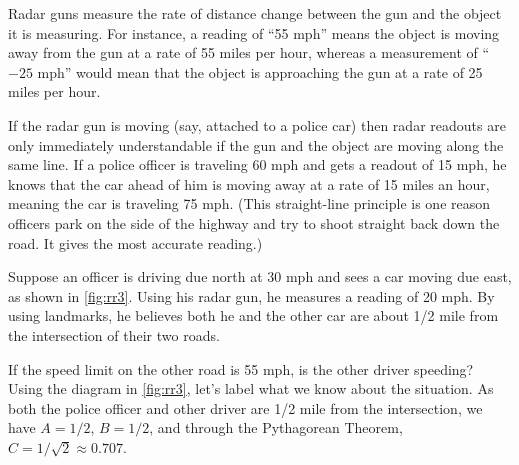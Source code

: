 \begin{example}\label{ex_rr3}
Radar guns measure the rate of distance change between the gun and the object it is measuring. For instance, a reading of ``55 mph'' means the object is moving away from the gun at a rate of 55 miles per hour, whereas a measurement of ``$-25$ mph'' would mean that the object is approaching the gun at a rate of 25 miles per hour.

If the radar gun is moving (say, attached to a police car) then radar readouts are only immediately understandable if the gun and the object are moving along the same line. If a police officer is traveling 60 mph and gets a readout of 15 mph, he knows that the car ahead of him is moving away at a rate of 15 miles an hour, meaning the car is traveling 75 mph. (This straight-line principle is one reason officers park on the side of the highway and try to shoot straight back down the road. It gives the most accurate reading.)


Suppose an officer is driving due north at 30 mph and sees a car moving due east, as shown in \autoref{fig:rr3}. Using his radar gun, he measures a reading of 20 mph. By using landmarks, he believes both he and the other car are about 1/2 mile from the intersection of their two roads. 

If the speed limit on the other road is 55 mph, is the other driver speeding?
\solution
Using the diagram in \autoref{fig:rr3}, let's label what we know about the situation. As both the police officer and other driver are 1/2 mile from the intersection, we have $A = 1/2$, $B = 1/2$, and through the Pythagorean Theorem, $C = 1/\sqrt{2}\approx 0.707$. 


\end{example}
